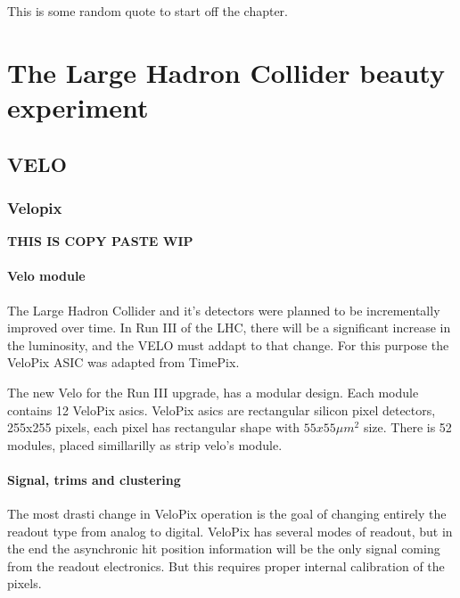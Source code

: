 \begin{savequote}[75mm]
This is some random quote to start off the chapter.
\end{savequote}

\chapter{The Large Hadron Collider beauty experiment}

\section{VELO}

\subsection{Velopix}

\textbf{THIS IS COPY PASTE WIP}
\subsubsection{Velo module}

The Large Hadron Collider and it's detectors were planned to be incrementally
improved over time. In Run III of the LHC, there will be a significant increase
in the luminosity, and the VELO must addapt to that change. For this purpose the
VeloPix ASIC was adapted from TimePix.


The new Velo for the Run III upgrade, has a modular design. Each module contains
12 VeloPix asics. VeloPix asics are rectangular silicon pixel detectors, 255x255 pixels,
each pixel has rectangular shape with $55 x 55 \mu m^{2}$ size. There is 52
modules, placed simillarilly as strip velo's module.

\subsubsection{Signal, trims and clustering}

The most drasti change in VeloPix operation is the goal of changing entirely the
readout type from analog to digital. VeloPix has several modes of readout, but
in the end the asynchronic hit position information will be the only signal coming from
the readout electronics. But this requires proper internal calibration of the
pixels.

